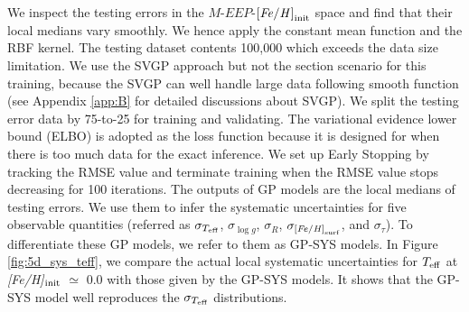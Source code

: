 We inspect the testing errors in the $M$-$EEP$-$\rm {\it [Fe/H]}_{\rm init}$ space and find that their local medians vary smoothly. We hence apply the constant mean function and the RBF kernel. The testing dataset contents 100,000 which exceeds the data size limitation. We use the SVGP approach but not the section scenario for this training, because the SVGP can well handle large data following smooth function (see Appendix \ref{app:B} for detailed discussions about SVGP). 
%
We split the testing error data by 75-to-25 for training and validating.  The variational evidence lower bound (ELBO) is adopted as the loss function because it is designed for when there is too much data for the exact inference. We set up Early Stopping by tracking the RMSE value and terminate training when the RMSE value stops decreasing for 100 iterations. The outputs of GP models are the local medians of testing errors. We use them to infer the systematic uncertainties for five observable quantities (referred as $\sigma_{T_{\rm eff}}$, $\sigma_{\log g}$, $\sigma_{R}$, $\sigma_{\rm {\it [Fe/H]}_{\rm surf}}$, and $\sigma_{\tau}$). To differentiate these GP models, we refer to them as GP-SYS models. In Figure \ref{fig:5d_sys_teff}, we compare the actual local systematic uncertainties for $T_{\rm eff}$ at {\it [Fe/H]}$_{\rm init}$ $\simeq$ 0.0 with those given by the GP-SYS models. It shows that the GP-SYS model well reproduces the $\sigma_{T_{\rm eff}}$ distributions. 

%

